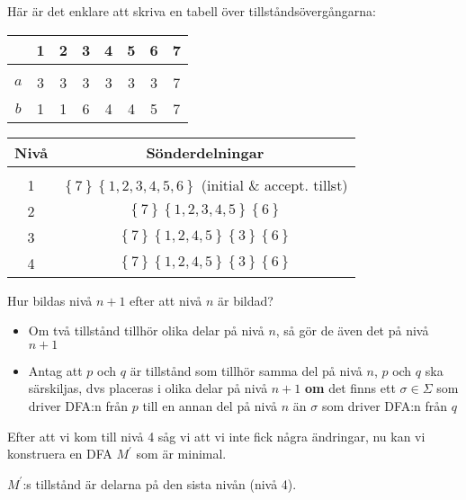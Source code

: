 \par\bigskip
\noindent Här är det enklare att skriva en tabell över tillståndsövergångarna:
\par\bigskip
\begin{center}
  \begin{tabular}{c|c|c|c|c|c|c|c}
    &1&2&3&4&5&6&7\\
    \hline\\
    $a$&3&3&3&3&3&3&7\\
    $b$&1&1&6&4&4&5&7
  \end{tabular}
\end{center}
\par\bigskip
\begin{center}
  \begin{tabular}{c|c}
    Nivå&Sönderdelningar\\
    \hline\\
    1&$\left\{7\right\}\left\{1,2,3,4,5,6\right\}$ (initial \& accept. tillst)\\
    2&$\left\{7\right\}\left\{1,2,3,4,5\right\}\left\{6\right\}$\\
    3&$\left\{7\right\}\left\{1,2,4,5\right\}\left\{3\right\}\left\{6\right\}$\\
    4&$\left\{7\right\}\left\{1,2,4,5\right\}\left\{3\right\}\left\{6\right\}$
  \end{tabular}
\end{center}
\par\bigskip
\noindent Hur bildas nivå $n+1$ efter att nivå $n$ är bildad?\par
\begin{itemize}
  \item Om två tillstånd tillhör olika delar på nivå $n$, så gör de även det på nivå $n+1$
  \item Antag att $p$ och $q$ är tillstånd som tillhör samma del på nivå $n$, $p$ och $q$ ska särskiljas, dvs placeras i olika delar på nivå $n+1$ \textbf{om} det finns ett $\sigma\in\Sigma$ som driver DFA:n från $p$ till en annan del på nivå $n$ än $\sigma$ som driver DFA:n från $q$ 
\end{itemize}
\par\bigskip
\noindent Efter att vi kom till nivå 4 såg vi att vi inte fick några ändringar, nu kan vi konstruera en DFA $M^{\prime}$ som är minimal.\par
\noindent $M^{\prime}$:s tillstånd är delarna på den sista nivån (nivå 4).


